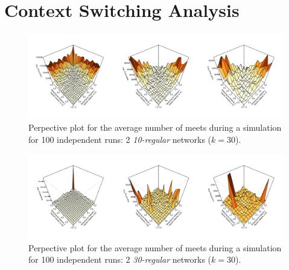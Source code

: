 \renewcommand\thefigure{\thesection.\arabic{figure}}    
\setcounter{figure}{0}   

\renewcommand\thetable{\thesection.\arabic{table}}    
\setcounter{table}{0}     


\section{Context Switching Analysis}
\label{append_ctx_switching}

\begin{figure}[H]
	\centering
	\includegraphics[width=1\linewidth]{"../analysis/pdf/context_switching_2_10_regular_switching_persp"}
	\begin{minipage}{0.9\textwidth}
		\caption{Perpective plot for the average number of meets during a simulation for 100 independent runs: 2 \textit{10-regular} networks ($k = 30$).}
		\label{append_fig:ctx_cs_2_10kreg}
	\end{minipage}
\end{figure}

\begin{figure}[H]
	\centering
	\includegraphics[width=1\linewidth]{"../analysis/pdf/context_switching_2_30_regular_switching_persp"}
	\begin{minipage}{0.9\textwidth}
		\caption{Perpective plot for the average number of meets during a simulation for 100 independent runs: 2 \textit{30-regular} networks ($k = 30$).}
		\label{append_fig:ctx_cs_2_30kreg}
	\end{minipage}
\end{figure}

